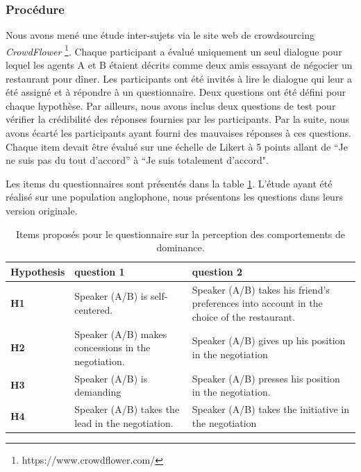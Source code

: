 {			\subsubsection{Procédure}
					\label{sec:questionnaire}
					Nous avons mené une étude inter-sujets via le site web de crowdsourcing  \emph {CrowdFlower} \footnote {https://www.crowdflower.com/}.
					Chaque participant a évalué uniquement un seul dialogue pour lequel les agents A et B étaient décrits comme deux amis essayant de négocier un restaurant pour dîner.
					Les participants ont été invités à lire le dialogue qui leur a été assigné et à répondre à un questionnaire.
					Deux questions ont été défini pour chaque hypothèse. Par ailleurs, nous avons inclus deux questions de test pour vérifier la crédibilité des réponses fournies par les participants. Par la suite, nous avons écarté les participants ayant fourni des mauvaises réponses à ces questions. 
					Chaque item devait être évalué sur une échelle de Likert à 5 points allant de ``Je ne suis pas du tout d'accord'' à ``Je suis totalement d'accord".
			
					Les items du questionnaires sont présentés dans la table \ref{table:questionnaire}. L'étude ayant été réalisé sur une population anglophone, nous présentons les questions dans leurs version originale. 
						
								\begin{table}[h]
																\centering
								\begin{tabular}{|p{1.75cm}|p{4cm}|p{4.8cm}|}

									\hline
									Hypothesis &question 1& question 2 \\
									\hline
									\textbf{H1} &Speaker (A/B) is self-centered. &Speaker (A/B) takes his friend's preferences into account in the choice of the restaurant.\\
									\hline
									\textbf{H2} &Speaker (A/B) makes concessions in the negotiation.&Speaker (A/B) gives up his position in the negotiation\\
									\hline
									\textbf{H3} & Speaker (A/B) is demanding&Speaker (A/B) presses his position in the negotiation. \\
									\hline
									\textbf{H4} &Speaker (A/B) takes the lead in the negotiation.&Speaker (A/B) takes the initiative in the negotiation \\
									\hline
								\end{tabular}
							
							\caption{Items proposés pour le questionnaire sur la perception des comportements de dominance.}
							\label{table:questionnaire}
						\end{table}
					
}
